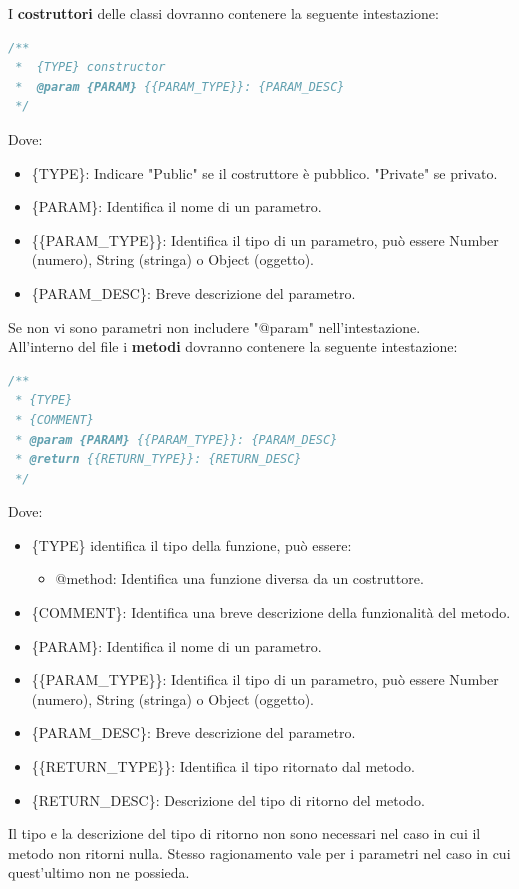 I \textbf{costruttori} delle classi dovranno contenere la seguente intestazione:

\begin{lstlisting}[language=JavaScript]
/**
 *  {TYPE} constructor
 *  @param {PARAM} {{PARAM_TYPE}}: {PARAM_DESC} 
 */
\end{lstlisting}
Dove:
\begin{itemize}
\item \{TYPE\}: Indicare "Public" se il costruttore è pubblico. "Private" se privato.
\item \{PARAM\}: Identifica il nome di un parametro.
\item \{\{PARAM\_TYPE\}\}: Identifica il tipo di un parametro, può essere Number (numero), String (stringa) o Object (oggetto).
\item \{PARAM\_DESC\}: Breve descrizione del parametro.
\end{itemize}
Se non vi sono parametri non includere "@param" nell'intestazione.
\\



All'interno del file i \textbf{metodi} dovranno contenere la seguente intestazione:

\begin{lstlisting}[language=JavaScript]
/**
 * {TYPE}
 * {COMMENT}
 * @param {PARAM} {{PARAM_TYPE}}: {PARAM_DESC}
 * @return {{RETURN_TYPE}}: {RETURN_DESC} 
 */
\end{lstlisting}

Dove:
\begin{itemize}
\item \{TYPE\} identifica il tipo della funzione, può essere:
\begin {itemize}
\item @method: Identifica una funzione diversa da un costruttore.
\end{itemize}
\item \{COMMENT\}: Identifica una breve descrizione della funzionalità del metodo.
\item \{PARAM\}: Identifica il nome di un parametro.
\item \{\{PARAM\_TYPE\}\}: Identifica il tipo di un parametro, può essere Number (numero), String (stringa) o Object (oggetto).
\item \{PARAM\_DESC\}: Breve descrizione del parametro.
\item \{\{RETURN\_TYPE\}\}: Identifica il tipo ritornato dal metodo.
\item \{RETURN\_DESC\}: Descrizione del tipo di ritorno del metodo.
\end{itemize}
Il tipo e la descrizione del tipo di ritorno non sono necessari nel caso in cui il metodo non ritorni nulla. Stesso ragionamento vale per i parametri nel caso in cui quest'ultimo non ne possieda.
\\



